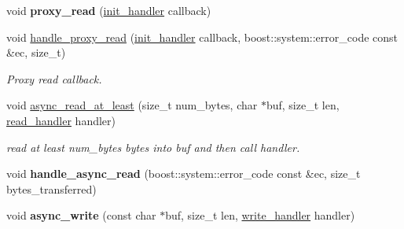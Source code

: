 \begin{DoxyCompactItemize}
\item 
void {\bfseries proxy\+\_\+read} (\hyperlink{namespacewebsocketpp_1_1transport_aeae75e675c1a334b3b33ab7120b480a5}{init\+\_\+handler} callback)\hypertarget{classwebsocketpp_1_1transport_1_1asio_1_1connection_a37efcf4f20e4291bb62174cdd4093730}{}\label{classwebsocketpp_1_1transport_1_1asio_1_1connection_a37efcf4f20e4291bb62174cdd4093730}

\item 
void \hyperlink{classwebsocketpp_1_1transport_1_1asio_1_1connection_a930a6861560e076dae30957404902f69}{handle\+\_\+proxy\+\_\+read} (\hyperlink{namespacewebsocketpp_1_1transport_aeae75e675c1a334b3b33ab7120b480a5}{init\+\_\+handler} callback, boost\+::system\+::error\+\_\+code const \&ec, size\+\_\+t)
\begin{DoxyCompactList}\small\item\em Proxy read callback. \end{DoxyCompactList}\item 
void \hyperlink{classwebsocketpp_1_1transport_1_1asio_1_1connection_a1ed9a4a93e753c4b84118760195f484c}{async\+\_\+read\+\_\+at\+\_\+least} (size\+\_\+t num\+\_\+bytes, char $\ast$buf, size\+\_\+t len, \hyperlink{namespacewebsocketpp_1_1transport_a3a9b2ed54dfcc6ebe7d7e6b4c02f53fb}{read\+\_\+handler} handler)\hypertarget{classwebsocketpp_1_1transport_1_1asio_1_1connection_a1ed9a4a93e753c4b84118760195f484c}{}\label{classwebsocketpp_1_1transport_1_1asio_1_1connection_a1ed9a4a93e753c4b84118760195f484c}

\begin{DoxyCompactList}\small\item\em read at least num\+\_\+bytes bytes into buf and then call handler. \end{DoxyCompactList}\item 
void {\bfseries handle\+\_\+async\+\_\+read} (boost\+::system\+::error\+\_\+code const \&ec, size\+\_\+t bytes\+\_\+transferred)\hypertarget{classwebsocketpp_1_1transport_1_1asio_1_1connection_a307feb9703c4f7ca50cb9750b5a47c0e}{}\label{classwebsocketpp_1_1transport_1_1asio_1_1connection_a307feb9703c4f7ca50cb9750b5a47c0e}

\item 
void {\bfseries async\+\_\+write} (const char $\ast$buf, size\+\_\+t len, \hyperlink{namespacewebsocketpp_1_1transport_addf5d728159e7aa2bce2a0df947b1560}{write\+\_\+handler} handler)\hypertarget{classwebsocketpp_1_1transport_1_1asio_1_1connection_a9c17ab9142868c2dd2ff74c478173bb3}{}\label{classwebsocketpp_1_1transport_1_1asio_1_1connection_a9c17ab9142868c2dd2ff74c478173bb3}


\end{DoxyCompactItemize}
